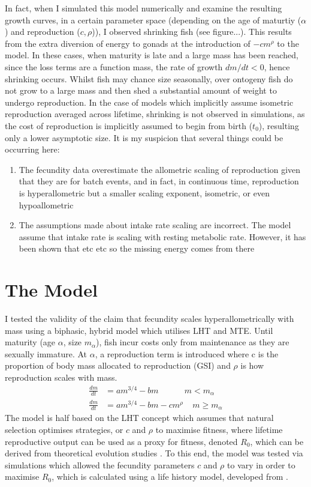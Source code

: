 \documentclass[a4paper]{article} %
\begin{document}
        In fact, when I simulated this model numerically and examine the resulting growth curves, in a certain parameter space (depending on the age of maturtiy ($\alpha$) and reproduction ($c, \rho$)), I observed shrinking fish (see figure...). This results from the extra diversion of energy to gonads at the introduction of $- cm^\rho$ to the model. In these cases, when maturity is late and a large mass has been reached, since the loss terms are a function mass, the rate of growth $dm/dt < 0$, hence shrinking occurs. Whilst fish may chance size seasonally, over ontogeny fish do not grow to a large mass and then shed a substantial amount of weight to undergo reproduction. In the case of models which implicitly assume isometric reproduction averaged across lifetime, shrinking is not observed in simulations, as the cost of reproduction is implicitly assumed to begin from birth ($t_0$), resulting only a lower asymptotic size. It is my suspicion that several things could be occurring here:
            \begin{enumerate}
                \item The fecundity data \autocite{Barneche2018d} overestimate the allometric scaling of reproduction given that they are for batch events, and in fact, in continuous time, reproduction is hyperallometric but a smaller scaling exponent, isometric, or even hypoallometric
                \item The assumptions made about intake rate scaling are incorrect. The \cite{West2001} model assume that intake rate is scaling with resting metabolic rate. However, it has been shown that \autocite{Pawar2012} etc etc so the missing energy comes from there
            \end{enumerate}
        
\section{The Model}\thispagestyle{empty}
I tested the validity of the claim that fecundity scales hyperallometrically with mass using a biphasic, hybrid model which utilises LHT and MTE. Until maturity (age $\alpha$, size $m_{\alpha}$), fish incur costs only from maintenance as they are sexually immature. At $\alpha$, a reproduction term is introduced where c is the proportion of body mass allocated to reproduction (GSI) and $\rho$ is how reproduction scales with mass.
\begin{align*}
    \frac{dm}{dt} &= am^{3/4} - bm \ \ \ \ \ \ \ \ \ \ \ \ \ \ m < m_{\alpha} \\
    \frac{dm}{dt} &= am^{3/4} - bm - cm^{\rho} \ \ \ \ \ m \geq m_{\alpha}
\end{align*}
The model is half based on the LHT concept which assumes that natural selection optimises strategies, or $c$ and $\rho$ to maximise fitness, where lifetime reproductive output can be used as a proxy for fitness, denoted $R_0$, which can be derived from theoretical evolution studies \autocite{Charnov2001, stearns1992evolution}. To this end, the model was tested via simulations which allowed the fecundity parameters $c$ and $\rho$ to vary in order to maximise $R_0$, which is calculated using a life history model, developed from \cite{Charnov2001}. 
\end{document}
